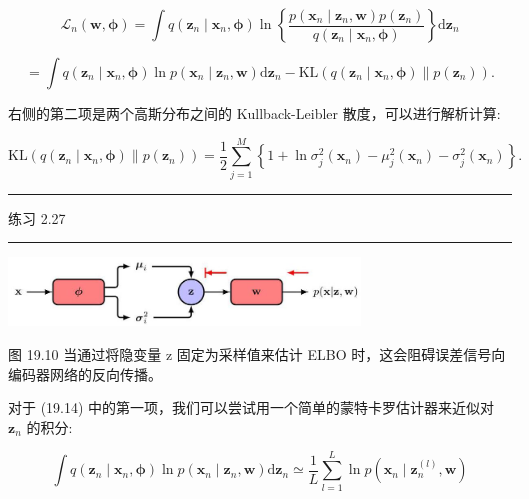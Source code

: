 \documentclass[10pt]{article}
\newcommand{\HRule}{\begin{center}\rule{0.9\linewidth}{0.2mm}\end{center}}
\begin{document}
\[
{\mathcal{L}}_{n}\left( {\mathbf{w},\mathbf{\phi }}\right)  = \int q\left( {{\mathbf{z}}_{n} \mid  {\mathbf{x}}_{n},\mathbf{\phi }}\right) \ln \left\{  \frac{p\left( {{\mathbf{x}}_{n} \mid  {\mathbf{z}}_{n},\mathbf{w}}\right) p\left( {\mathbf{z}}_{n}\right) }{q\left( {{\mathbf{z}}_{n} \mid  {\mathbf{x}}_{n},\mathbf{\phi }}\right) }\right\}  \mathrm{d}{\mathbf{z}}_{n}
\]

\[
= \int q\left( {{\mathbf{z}}_{n} \mid  {\mathbf{x}}_{n},\mathbf{\phi }}\right) \ln p\left( {{\mathbf{x}}_{n} \mid  {\mathbf{z}}_{n},\mathbf{w}}\right) \mathrm{d}{\mathbf{z}}_{n} - \mathrm{{KL}}\left( {q\left( {{\mathbf{z}}_{n} \mid  {\mathbf{x}}_{n},\mathbf{\phi }}\right) \parallel p\left( {\mathbf{z}}_{n}\right) }\right) . \tag{19.14}
\]

右侧的第二项是两个高斯分布之间的 Kullback-Leibler 散度，可以进行解析计算:

\[
\mathrm{{KL}}\left( {q\left( {{\mathbf{z}}_{n} \mid  {\mathbf{x}}_{n},\mathbf{\phi }}\right) \parallel p\left( {\mathbf{z}}_{n}\right) }\right)  = \frac{1}{2}\mathop{\sum }\limits_{{j = 1}}^{M}\left\{  {1 + \ln {\sigma }_{j}^{2}\left( {\mathbf{x}}_{n}\right)  - {\mu }_{j}^{2}\left( {\mathbf{x}}_{n}\right)  - {\sigma }_{j}^{2}\left( {\mathbf{x}}_{n}\right) }\right\}  . \tag{19.15}
\]

\HRule

练习 2.27

\HRule

\begin{center}
\includegraphics[max width=0.7\textwidth]{images/0194e279-9b28-703a-88f4-c3ac21e2010d_594_594_354_872_171_0.jpg}
\end{center}
\hspace*{3em} 

图 19.10 当通过将隐变量 \(\mathrm{z}\) 固定为采样值来估计 ELBO 时，这会阻碍误差信号向编码器网络的反向传播。

对于 (19.14) 中的第一项，我们可以尝试用一个简单的蒙特卡罗估计器来近似对 \({\mathbf{z}}_{n}\) 的积分:

\[
\int q\left( {{\mathbf{z}}_{n} \mid  {\mathbf{x}}_{n},\mathbf{\phi }}\right) \ln p\left( {{\mathbf{x}}_{n} \mid  {\mathbf{z}}_{n},\mathbf{w}}\right) \mathrm{d}{\mathbf{z}}_{n} \simeq  \frac{1}{L}\mathop{\sum }\limits_{{l = 1}}^{L}\ln p\left( {{\mathbf{x}}_{n} \mid  {\mathbf{z}}_{n}^{\left( l\right) },\mathbf{w}}\right)  \tag{19.16}
\]
\end{document}
